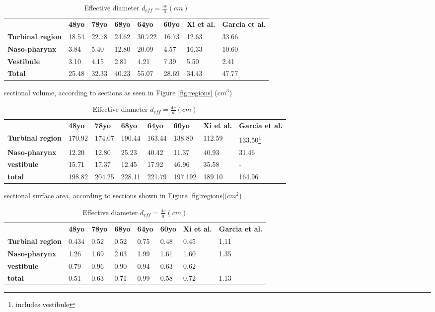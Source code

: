 \begin{table}
  \begin{tabular}{p{}p{}p{}p{}p{}p{}p{}p{}}
 & \textbf{48yo} & \textbf{78yo} & \textbf{68yo} & \textbf{64yo} & \textbf{60yo} &\textbf{Xi et al. \cite{Xi2012}} & \textbf{Garcia et al.\cite{Garcia2007}} \\
\cline{2-8}
\textbf{Turbinal region} & 18.54 & 22.78 & 24.62 & 30.722 & 16.73 & 12.63 & 33.66\\
\textbf{Naso-pharynx}  & 3.84 & 5.40 & 12.80 & 20.09 & 4.57 & 16.33 & 10.60\\
\textbf{Vestibule} & 3.10 & 4.15 & 2.81 & 4.21 & 7.39 & 5.50 & 2.41\\
\textbf{Total} & 25.48 & 32.33 & 40.23 & 55.07 & 28.69 & 34.43 & 47.77 \\
\hline
\end{tabular}
\caption{ sectional volume, according to sections as seen in Figure \ref{fig:regions} ($ cm^3 $)}\label{tab:secvol}
  \begin{tabular}{p{}p{}p{}p{}p{}p{}p{}p{}}
 & \textbf{48yo} & \textbf{78yo} & \textbf{68yo} & \textbf{64yo} &\textbf{60yo}& \textbf{Xi et al.} & \textbf{Garcia et al.}\\
 \cline{2-8}
\textbf{Turbinal region} & 170.92 & 174.07& 190.44 & 163.44 & 138.80 & 112.59 & 133.50\footnote{includes vestibule} \\
\textbf{Naso-pharynx} & 12.20 & 12.80 & 25.23 & 40.42 & 11.37 & 40.93 & 31.46\\
\textbf{vestibule} & 15.71 & 17.37 & 12.45 & 17.92 & 46.96 & 35.58 &  -\\
\textbf{total} & 198.82 & 204.25 & 228.11 & 221.79 & 197.192 & 189.10 & 164.96\\
\hline
\end{tabular}
\caption{sectional surface area, according to sections shown in Figure \ref{fig:regions}($ cm^2 $)}\label{tab:secsa}
  \begin{tabular}{p{}p{}p{}p{}p{}p{}p{}p{}}
& \textbf{48yo}  & \textbf{78yo} & \textbf{68yo} & \textbf{64yo} & \textbf{60yo} & \textbf{Xi et al.} & \textbf{Garcia et al.}\\
 \cline{2-8}
\textbf{Turbinal region} & 0.434 & 0.52 & 0.52 & 0.75 & 0.48 & 0.45 & 1.11\\
\textbf{Naso-pharynx} & 1.26 & 1.69 & 2.03 & 1.99 & 1.61 & 1.60 & 1.35\\
\textbf{vestibule} & 0.79 & 0.96 & 0.90 & 0.94 & 0.63 & 0.62 &  - \\
\textbf{total} & 0.51 & 0.63 & 0.71 & 0.99 & 0.58 & 0.72 & 1.13 \\
\hline
\end{tabular}
\caption{Effective diameter $d_{eff} = \frac{4v}{a} (cm) $}\label{tab:deff}


\end{table}
